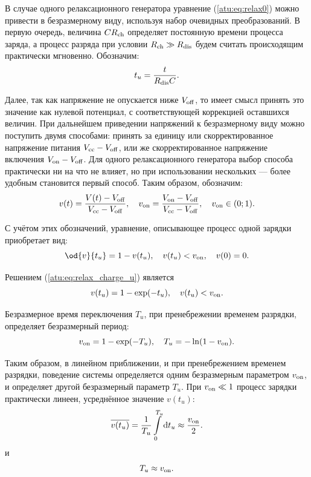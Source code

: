 В случае одного релаксационного генератора
уравнение (\ref{atu:eq:relax0}) можно привести в безразмерному виду,
используя набор очевидных преобразований. В первую
очередь, величина $C R_\mathrm{ch}$ определяет
постоянную времени процесса заряда, а процесс
разряда при условии $R_\mathrm{ch} \gg R_\mathrm{dis} $ будем считать происходящим практически мгновенно.
Обозначим:
%
\begin{equation}
  t_u = \frac{t}{R_\mathrm{dis} C} .
  \label{atu:eq:t_u_relax}
\end{equation}

Далее, так как напряжение не опускается ниже $V_\mathrm{off}$,
то имеет смысл принять это значение как нулевой потенциал, с соответствующей
коррекцией оставшихся величин. При дальнейшем приведении напряжений к безразмерному виду
можно поступить двумя способами: принять за единицу или
скорректированное напряжение питания $V_\mathrm{cc}-V_\mathrm{off}$,
или же
скорректированное напряжение включения $V_\mathrm{on}-V_\mathrm{off}$.
Для одного релаксационного генератора выбор способа практически ни
на что не влияет, но при использовании нескольких --- более удобным
становится первый способ. Таким образом, обозначим:
%
\begin{equation}
  v(t) = \frac{V(t)-V_\mathrm{off}}{V_\mathrm{cc}-V_\mathrm{off}},
  \quad
  v_\mathrm{on} = \frac{V_\mathrm{on}-V_\mathrm{off}}{V_\mathrm{cc}-V_\mathrm{off}},
  \quad
  v_\mathrm{on} \in ( 0; 1 ).
  \label{atu:eq:v_u_relax}
\end{equation}

С учётом этих обозначений, уравнение, описывающее процесс одной зарядки приобретает вид:
%
\begin{equation}
  \od{v}{t_u} = 1 - v( t_u ),
  \quad
  v( t_u ) < v\Tidx{on},
  \quad
  v(0) = 0.
  \label{atu:eq:relax_charge_u}
\end{equation}

Решением (\ref{atu:eq:relax_charge_u}) является
%
\begin{equation}
  v(t_u) = 1 - \exp( - t_u ) ,
  \quad
  v( t_u ) < v_\mathrm{on}.
  \label{atu:eq:relax_charge_u_solu}
\end{equation}

Безразмерное время переключения $T_u$,
при пренебрежении временем разрядки,
определяет безразмерный период:
%
\begin{equation}
  v_\mathrm{on} = 1 - \exp( - T_u ),
  \quad
  T_u = - \ln ( 1 - v_\mathrm{on} ).
  \label{atu:eq:T_u_relax}
\end{equation}

Таким образом, в линейном приближении, и при пренебрежением временем разрядки,
поведение системы определяется одним безразмерным параметром $v_\mathrm{on}$,
и определяет другой безразмерный параметр $T_u$.
При $v_\mathrm{on} \ll 1 $ процесс зарядки практически линеен,
усреднённое значение $v(t_u)$:
%
\begin{equation}
  \overline{v(t_u)} =
  \frac{1}{T_u}\int\limits_{0}^{T_u} \mathrm{d}t_u
  \approx
  \frac{v_\mathrm{on}}{ 2 }.
  \label{atu:eq:av_lin_relax}
\end{equation}
%
и
%
\begin{equation}
  T_u
  \approx
  v_\mathrm{on}.
  \label{atu:eq:T_u_lin_relax}
\end{equation}

